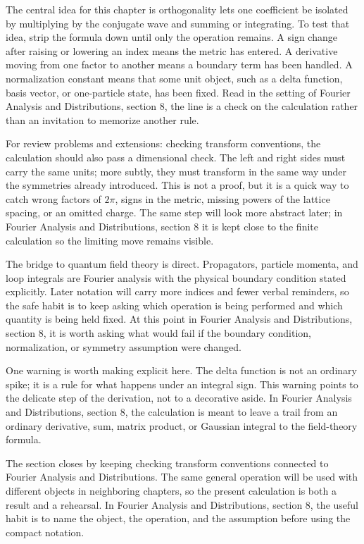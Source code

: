 The central idea for this chapter is orthogonality lets one coefficient be isolated by multiplying by the conjugate wave and summing or integrating.  To test that idea, strip the formula down until only the operation remains.  A sign change after raising or lowering an index means the metric has entered.  A derivative moving from one factor to another means a boundary term has been handled.  A normalization constant means that some unit object, such as a delta function, basis vector, or one-particle state, has been fixed.  Read in the setting of Fourier Analysis and Distributions, section 8, the line is a check on the calculation rather than an invitation to memorize another rule.

For review problems and extensions: checking transform conventions, the calculation should also pass a dimensional check.  The left and right sides must carry the same units; more subtly, they must transform in the same way under the symmetries already introduced.  This is not a proof, but it is a quick way to catch wrong factors of \(2\pi\), signs in the metric, missing powers of the lattice spacing, or an omitted charge.  The same step will look more abstract later; in Fourier Analysis and Distributions, section 8 it is kept close to the finite calculation so the limiting move remains visible.

The bridge to quantum field theory is direct.  Propagators, particle momenta, and loop integrals are Fourier analysis with the physical boundary condition stated explicitly.  Later notation will carry more indices and fewer verbal reminders, so the safe habit is to keep asking which operation is being performed and which quantity is being held fixed.  At this point in Fourier Analysis and Distributions, section 8, it is worth asking what would fail if the boundary condition, normalization, or symmetry assumption were changed.

One warning is worth making explicit here.  The delta function is not an ordinary spike; it is a rule for what happens under an integral sign.  This warning points to the delicate step of the derivation, not to a decorative aside.  In Fourier Analysis and Distributions, section 8, the calculation is meant to leave a trail from an ordinary derivative, sum, matrix product, or Gaussian integral to the field-theory formula.

The section closes by keeping checking transform conventions connected to Fourier Analysis and Distributions.  The same general operation will be used with different objects in neighboring chapters, so the present calculation is both a result and a rehearsal.  In Fourier Analysis and Distributions, section 8, the useful habit is to name the object, the operation, and the assumption before using the compact notation.



